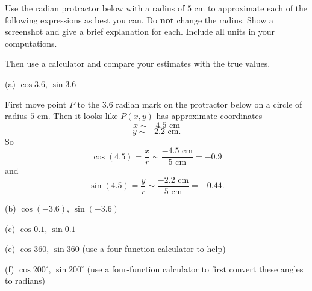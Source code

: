 \documentclass{ximera}
\begin{document}
\begin{exploration}\label{Exp1:CF}
Use the radian protractor below with a radius of $5$ cm to approximate each of the following expressions as best you can. Do {\bf not} change the radius. Show a screenshot and give a brief explanation for each. Include all units in your computations. 

Then use a calculator and compare your estimates with the true values.

(a) $\cos 3.6$, $\sin 3.6$  %

\begin{explanation}
First move point $P$ to the $3.6$ radian mark on the protractor below on a circle of radius $5$ cm. Then it looks like $P(x,y)$ has approximate coordinates
\[
     x \sim -4.5 \text{ cm}
\]
\[
    y \sim -2.2 \text{ cm} .
\]
So 
\[
   \cos (4.5) = \frac{x}{r} \sim \frac{-4.5 \text{ cm}}{5 \text{ cm}} = -0.9
\]
and 
\[
   \sin (4.5) = \frac{y}{r} \sim \frac{-2.2 \text{ cm}}{5 \text{ cm}} = -0.44 .
\]

 
\begin{onlineOnly}
    \begin{center}
\end{center}
\end{onlineOnly}



\end{explanation}

(b) $\cos (-3.6)$,  $\sin (-3.6)$ %

(c) $\cos 0.1$, $\sin 0.1$ %


(e) $\cos 360$, $\sin 360$ (use a four-function calculator to help)

(f) $\cos 200^\circ$, $\sin 200^\circ$ (use a four-function calculator to first convert these angles to radians)

 
\begin{onlineOnly}
    \begin{center}
\end{center}
\end{onlineOnly}
\end{exploration}
\end{document}
